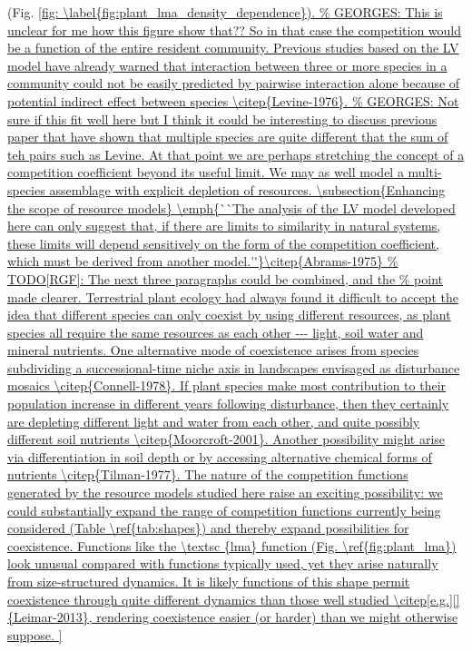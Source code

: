\documentclass[a4paper,11pt]{article}
\begin{document}
(Fig. \ref{fig:  \label{fig:plant_lma_density_dependence}). %
 So in that case the competition would be a function of the entire resident community. Previous studies based on the LV model have already warned that interaction between three or more species in a community could not be easily predicted by pairwise interaction alone because of potential indirect effect between species \citep{Levine-1976}.
 At that point we are perhaps stretching the concept of a competition coefficient beyond its useful limit. We may as well model a multi-species assemblage with explicit depletion of resources.

\subsection{Enhancing the scope of resource models}

\emph{``The analysis of the LV model developed here can only suggest that, if there are limits to similarity in natural systems, these limits will depend sensitively on the form of the competition coefficient,
which must be derived from another model.''}\citep{Abrams-1975}

Terrestrial plant ecology had always found it difficult to accept the idea that different species can only coexist by using different resources, as plant species all require the same resources as each other ---
light, soil water and mineral nutrients. One alternative mode of coexistence arises from species subdividing a successional-time niche axis in landscapes envisaged as disturbance mosaics \citep{Connell-1978}. If plant species make most contribution to their population increase in different years following disturbance, then they certainly are depleting different light and water from each other, and quite possibly different soil nutrients \citep{Moorcroft-2001}. Another possibility might arise via differentiation in soil depth or by accessing alternative chemical forms of nutrients \citep{Tilman-1977}.

The nature of the competition functions generated by the resource models studied here raise an exciting possibility: we could substantially expand the range of competition functions currently being considered (Table \ref{tab:shapes}) and thereby expand possibilities for coexistence. Functions like the \textsc {lma} function
(Fig. \ref{fig:plant_lma}) look unusual compared with functions typically used, yet they arise naturally from size-structured dynamics.
It is likely functions of this shape permit coexistence through quite different dynamics than those well studied
\citep[e.g.][]{Leimar-2013}, rendering coexistence easier (or harder)
than we might otherwise suppose.

}
\end{document}

